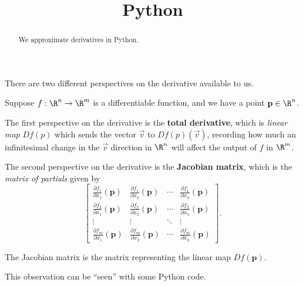 \documentclass{ximera}
\title{Python}
\begin{document}
\begin{abstract}
  We approximate derivatives in Python.
\end{abstract}\maketitle

There are two different perspectives on the derivative available to us.

Suppose $f : \R^n \to \R^m$ is a differentiable function, and we have
a point $\mathbf{p} \in \R^n$.

The first perspective on the derivative is the \textbf{total
  derivative}, which is \textit{linear map} $Df(p)$ which sends the
vector $\vec{v}$ to $Df(p)(\vec{v})$, recording how much an
infinitesimal change in the $\vec{v}$ direction in $\R^n$ will affect
the output of $f$ in $\R^m$.

The second perspective on the derivative is the \textbf{Jacobian
  matrix}, which is the \textit{matrix of partials} given by
$$
\begin{bmatrix}
  \frac{\partial f_1}{\partial x_1} \left(\mathbf{p}\right) & \frac{\partial f_1}{\partial x_2} \left(\mathbf{p}\right) & \cdots & \frac{\partial f_1}{\partial x_n}\left(\mathbf{p}\right) \\
  \frac{\partial f_2}{\partial x_1} \left(\mathbf{p}\right) & \frac{\partial f_2}{\partial x_2} \left(\mathbf{p}\right) & \cdots & \frac{\partial f_2}{\partial x_n}\left(\mathbf{p}\right) \\
  \vdots                                                    & \vdots                                                    & \ddots & \vdots \\
  \frac{\partial f_m}{\partial x_1} \left(\mathbf{p}\right) & \frac{\partial f_m}{\partial x_2} \left(\mathbf{p}\right) & \cdots & \frac{\partial f_m}{\partial x_n}\left(\mathbf{p}\right) 
\end{bmatrix}.
$$

\begin{observation}
  The Jacobian matrix is the matrix representing the linear map $Df(\mathbf{p})$.
\end{observation}

This observation can be ``seen'' with some Python code.
\end{document}
